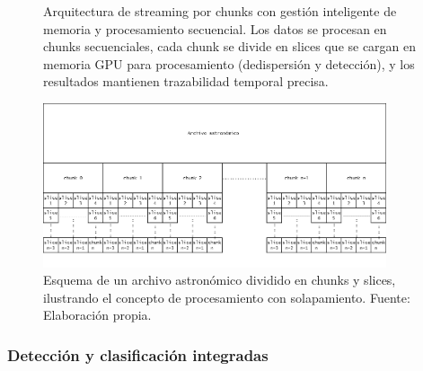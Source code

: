 \begin{figure}[H]
{%
}
\caption[Arquitectura de streaming]{Arquitectura de streaming por chunks con gestión inteligente de memoria y procesamiento secuencial. Los datos se procesan en chunks secuenciales, cada chunk se divide en slices que se cargan en memoria GPU para procesamiento (dedispersión y detección), y los resultados mantienen trazabilidad temporal precisa.}
\label{fig:streaming-architecture}
\end{figure}

\begin{figure}[H]
\centering
\includegraphics[width=0.9\textwidth]{figures/sistema-chunks.png}
\caption[Esquema de chunks y slices]{Esquema de un archivo astronómico dividido en chunks y slices, ilustrando el concepto de procesamiento con solapamiento. Fuente: Elaboración propia.}
\label{fig:sistema-chunks}
\end{figure}

\subsubsection{Detección y clasificación integradas}
